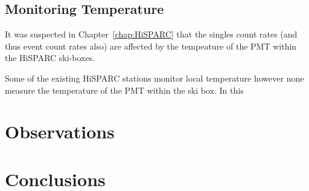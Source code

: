 \subsection{Monitoring Temperature}

It was suspected in Chapter~\ref{chap:HiSPARC} that the singles count rates (and thus event count rates also) are affected by the tempeature of the PMT within the HiSPARC ski-boxes.

Some of the existing HiSPARC stations monitor local temperature however none measure the temperature of the PMT within the ski box. In this



\section{Observations}\label{sec:HS_14008_observations}


\section{Conclusions}\label{sec:HS_14008_conclusion}
